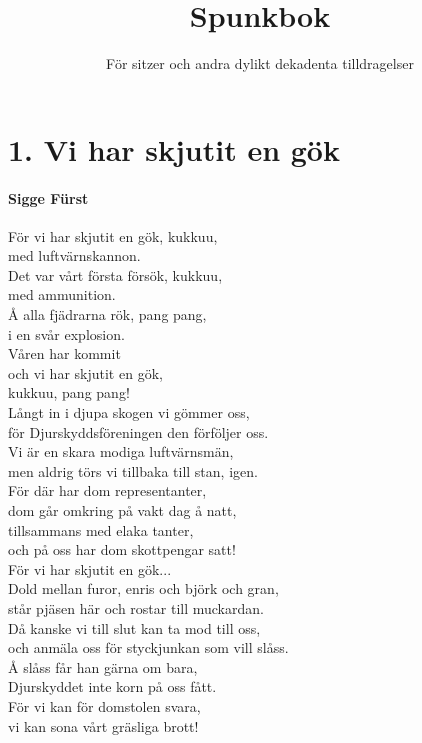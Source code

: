 \documentclass[11pt]{book}
\title{Spunkbok}
\author{För sitzer och andra dylikt dekadenta tilldragelser}
\date{}
\begin{document}
\maketitle
\pagestyle{empty}


\section*{1. Vi har skjutit en gök}
\paragraph*{Sigge F\"urst}
$$$$
För vi har skjutit en gök, kukkuu, \\
med luftvärnskannon.\\
Det var vårt första försök, kukkuu,\\
med ammunition.\\
Å alla fjädrarna rök, pang pang,\\
i en svår explosion.\\
Våren har kommit\\
och vi har skjutit en gök,\\
kukkuu, pang pang!\\

\noindent
Långt in i djupa skogen vi gömmer oss,\\
för Djurskyddsföreningen den förföljer oss.\\
Vi är en skara modiga luftvärnsmän,\\
men aldrig törs vi tillbaka till stan, igen.\\
För där har dom representanter,\\
dom går omkring på vakt dag å natt,\\
tillsammans med elaka tanter,\\
och på oss har dom skottpengar satt!\\

För vi har skjutit en gök...\\

\noindent
Dold mellan furor, enris och björk och gran,\\
står pjäsen här och rostar till muckardan.\\
Då kanske vi till slut kan ta mod till oss,\\
och anmäla oss för styckjunkan som vill slåss.\\
Å slåss får han gärna om bara,\\
Djurskyddet inte korn på oss fått.\\
För vi kan för domstolen svara,\\
vi kan sona vårt gräsliga brott!\\
\end{document}
